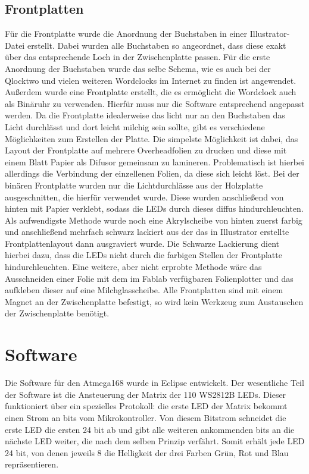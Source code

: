 \documentclass[12pt,journal,compsoc]{IEEEtran}
\begin{document}
\subsection{Frontplatten}
Für die Frontplatte wurde die Anordnung der Buchstaben in einer Illustrator-Datei erstellt. Dabei wurden alle Buchstaben so angeordnet, dass diese exakt über das entsprechende Loch in der Zwischenplatte passen. Für die erste Anordnung der Buchstaben wurde das selbe Schema, wie es auch bei der Qlocktwo und vielen weiteren Wordclocks im Internet zu finden ist angewendet. Außerdem wurde eine Frontplatte erstellt, die es ermöglicht die Wordclock auch als Binäruhr zu verwenden. Hierfür muss nur die Software entsprechend angepasst werden. Da die Frontplatte idealerweise das licht nur an den Buchstaben das Licht durchlässt und dort leicht milchig sein sollte, gibt es  verschiedene Möglichkeiten zum Erstellen der Platte. Die simpelste Möglichkeit ist dabei, das Layout der Frontplatte auf mehrere Overheadfolien zu drucken und diese mit einem Blatt Papier als Difusor gemeinsam zu lamineren. Problematisch ist hierbei allerdings die Verbindung der einzellenen Folien, da diese sich leicht löst. Bei der binären Frontplatte wurden nur die Lichtdurchlässe aus der Holzplatte ausgeschnitten, die hierfür verwendet wurde. Diese wurden anschließend von hinten mit Papier verklebt, sodass die LEDs durch dieses diffus hindurchleuchten. Als aufwendigste Methode wurde noch eine Akrylscheibe von hinten zuerst farbig und anschließend mehrfach schwarz lackiert aus der das in Illustrator erstellte Frontplattenlayout dann ausgraviert wurde. Die Schwarze Lackierung dient hierbei dazu, dass die LEDs nicht durch die farbigen Stellen der Frontplatte hindurchleuchten. Eine weitere, aber nicht erprobte Methode wäre das Ausschneiden einer Folie mit dem im Fablab verfügbaren Folienplotter und das aufkleben dieser auf eine Milchglasscheibe. Alle Frontplatten sind mit einem Magnet an der Zwischenplatte befestigt, so wird kein Werkzeug zum Austauschen der Zwischenplatte benötigt.
\section{Software}
Die Software für den Atmega168 wurde in Eclipse entwickelt. Der wesentliche Teil der Software ist die Ansteuerung der Matrix der 110 WS2812B LEDs. Dieser funktioniert über ein spezielles Protokoll: die erste LED der Matrix bekommt einen Strom an bits vom Mikrokontroller. Von diesem Bitstrom schneidet die erste LED die ersten 24 bit ab und gibt alle weiteren ankommenden bits an die nächste LED weiter, die nach dem selben Prinzip verfährt. Somit erhält jede LED 24 bit, von denen jeweils 8 die Helligkeit der drei Farben Grün, Rot und Blau repräsentieren.
\end{document}
